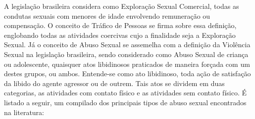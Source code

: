 
A legislação brasileira considera como Exploração Sexual Comercial, todas as condutas sexuais com menores de idade envolvendo remuneração ou compensação. O conceito de Tráfico de Pessoas se firma sobre essa definição, englobando todas as atividades coercivas cujo a finalidade seja a Exploração Sexual. Já o conceito de Abuso Sexual se assemelha com a definição da Violência Sexual na legislação brasileira, sendo considerado como Abuso Sexual de criança ou adolescente, quaisquer atos libidinosos praticados de maneira forçada com um destes grupos, ou ambos. Entende-se como ato libidinoso, toda ação de satisfação da libido do agente agressor ou de outrem. Tais atos se dividem em duas categorias, as atividades com contato físico e as atividades sem contato físico. É listado a seguir, um compilado dos principais tipos de abuso sexual encontrados na literatura: 

